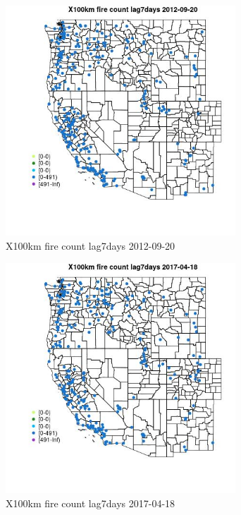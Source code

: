 \begin{figure} 
\centering  
\includegraphics[width=0.77\textwidth]{Code_Outputs/Report_ML_input_PM25_Step4_part_e_de_duplicated_aves_compiled_2019-05-14wNAs_MapObsX100km_fire_count_lag7days2012-09-20.jpg} 
\caption{\label{fig:Report_ML_input_PM25_Step4_part_e_de_duplicated_aves_compiled_2019-05-14wNAsMapObsX100km_fire_count_lag7days2012-09-20}X100km fire count lag7days 2012-09-20} 
\end{figure} 
 

\begin{figure} 
\centering  
\includegraphics[width=0.77\textwidth]{Code_Outputs/Report_ML_input_PM25_Step4_part_e_de_duplicated_aves_compiled_2019-05-14wNAs_MapObsX100km_fire_count_lag7days2017-04-18.jpg} 
\caption{\label{fig:Report_ML_input_PM25_Step4_part_e_de_duplicated_aves_compiled_2019-05-14wNAsMapObsX100km_fire_count_lag7days2017-04-18}X100km fire count lag7days 2017-04-18} 
\end{figure} 
 

